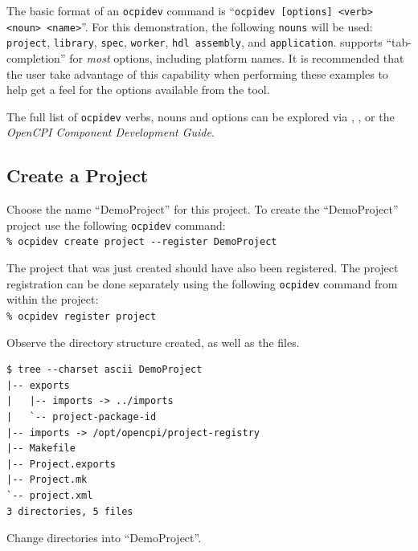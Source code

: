 The basic format of an \verb+ocpidev+ command is ``\verb+ocpidev [options] <verb> <noun> <name>+''.
For this demonstration, the following \verb+nouns+ will be used: \verb+project+, \verb+library+, \verb+spec+, \verb+worker+, \verb+hdl assembly+, and \verb+application+.
 supports ``tab-completion'' for \textit{most} options, including platform names.
It is recommended that the user take advantage of this capability when performing these examples to help get a feel for the options available from the tool.
\newline

The full list of \verb+ocpidev+ verbs, nouns and options can be explored via , , or the \textit{OpenCPI Component Development Guide}.

\subsection{Create a Project}
Choose the name ``DemoProject'' for this project. To create the ``DemoProject'' project use the following \verb+ocpidev+ command:\\

\forceindent\verb+% ocpidev create project --register DemoProject+\\

The project that was just created should have also been registered.
The project registration can be done separately using the following \verb+ocpidev+ command from within the project:\\

\forceindent\forceindent\verb+% ocpidev register project+\\

Observe the directory structure created, as well as the files.\\

\bstart
\begin{verbatim}
$ tree --charset ascii DemoProject
|-- exports
|   |-- imports -> ../imports
|   `-- project-package-id
|-- imports -> /opt/opencpi/project-registry
|-- Makefile
|-- Project.exports
|-- Project.mk
`-- project.xml
3 directories, 5 files
\end{verbatim}
\bend
Change directories into ``DemoProject''.

